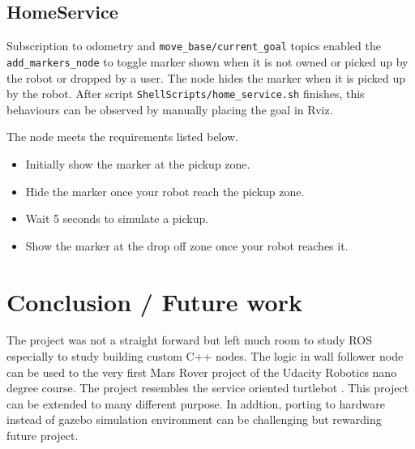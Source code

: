 \documentclass[10pt,journal,compsoc]{IEEEtran}
\begin{document}
\subsection{HomeService}
Subscription to odometry and \verb!move_base/current_goal! topics enabled the \verb!add_markers_node! to toggle marker shown when it is not owned or picked up by the robot or dropped by a user.
The node hides the marker when it is picked up by the robot. After script \verb!ShellScripts/home_service.sh! finishes, this behaviours can be observed by manually placing the goal in Rviz.

The node meets the requirements listed below.

\begin{itemize}
      \item Initially show the marker at the pickup zone.
      \item Hide the marker once your robot reach the pickup zone.
      \item Wait 5 seconds to simulate a pickup.
      \item Show the marker at the drop off zone once your robot reaches it.
\end{itemize}

\section{Conclusion / Future work}
The project was not a straight forward but left much room to study ROS especially to study building custom C++ nodes. The logic in wall follower node can be used to the very first Mars Rover project of the Udacity Robotics nano degree course.
The project resembles the service oriented turtlebot \cite{Koubaa2016}. This project can be extended to many different purpose. In addtion, porting to hardware instead of gazebo simulation environment can be challenging but rewarding future project.


\end{document}
